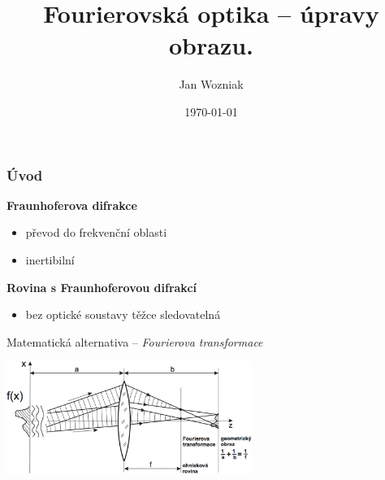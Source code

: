\documentclass[10pt, xcolor=pdflatex, dvipsnames, table]{beamer}
\title{Fourierovská optika -- úpravy obrazu.}
\author{Jan Wozniak}
\institute[FIT VUT]{Vysoké učení technické v~Brně\\
Fakulta informační technologií}
\date{\today}
\begin{document}
\begin{frame}[plain]
\titlepage
\end{frame}

\begin{frame}
\frametitle{Úvod}
\textbf{Fraunhoferova difrakce}
\begin{itemize}
\item převod do frekvenční oblasti
\item inertibilní
\end{itemize}

\vspace{1em}

\textbf{Rovina s Fraunhoferovou difrakcí} 
\begin{itemize}
\item bez optické soustavy těžce sledovatelná
\end{itemize}

\vspace{1em}

Matematická alternativa -- \textit{Fourierova transformace}

\vspace{1em}

\begin{center}
\includegraphics[width=8cm]{images/ft-cocka.png}
\end{center}
\end{frame}
\end{document}
